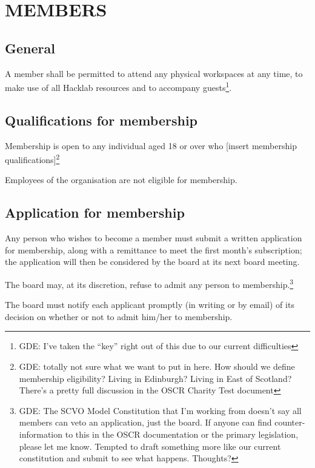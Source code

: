 \documentclass{article}
\begin{document}
\section{MEMBERS}

\subsection{General}

\clause A member shall be permitted to attend any physical workspaces
at any time, to make use of all Hacklab resources and to accompany
guests\footnote{GDE: I've taken the ``key'' right out of this due to
  our current difficulties}.

\subsection{Qualifications for membership}

\clause Membership is open to any individual aged 18 or over who
[insert membership qualifications]\footnote{GDE: totally not sure what
  we want to put in here. How should we define membership eligibility?
  Living in Edinburgh? Living in East of Scotland? There's a pretty
  full discussion in the OSCR Charity Test document}

\clause Employees of the organisation are not eligible for membership.

\subsection{Application for membership}

\clause Any person who wishes to become a member must submit a written
application for membership, along with a remittance to meet the first
month's subscription; the application will then be considered by the
board at its next board meeting.  

\clause The board may, at its discretion, refuse to admit any person
to membership.\footnote{GDE: The SCVO Model Constitution that I'm
  working from doesn't say all members can veto an application, just
  the board. If anyone can find counter-information to this in the
  OSCR documentation or the primary legislation, please let me
  know. Tempted to draft something more like our current constitution
  and submit to see what happens. Thoughts?} 
 
\clause The board must notify each applicant promptly (in writing or
by email) of its decision on whether or not to admit him/her to
membership.
\end{document}
